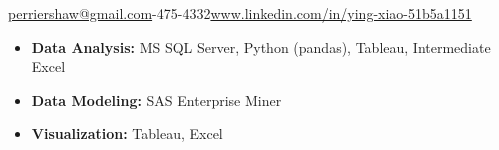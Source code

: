 \documentclass[10pt,a4paper]{article}
\begin{document}
\sloppy  %


\begin{center}
\end{center}

\nobreakvspace{0.3em}  %

\noindent\href{mailto:perriershaw@gmail.com}{perriershaw@gmail.com}-475-4332\sbull\href{https://www.linkedin.com/in/ying-xiao-51b5a1151}{www.linkedin.com/in/ying-xiao-51b5a1151}

\spacedhrule{0em}{-1em}  %
\begin{itemize}
\setlength{\itemsep}{0.1em}
\item \textbf{Data Analysis:} MS SQL Server, Python (pandas), Tableau, Intermediate Excel
\item \textbf{Data Modeling:} SAS Enterprise Miner
\item \textbf{Visualization:} Tableau, Excel
\end{itemize}



\end{document}
